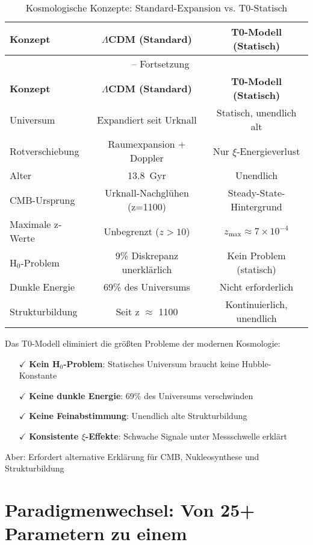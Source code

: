 \documentclass[12pt,a4paper]{article}
\theoremstyle{definition}
\begin{document}
	\begin{longtable}{lcc}
		\caption{Kosmologische Konzepte: Standard-Expansion vs. T0-Statisch} \\
		\toprule
		\textbf{Konzept} & \textbf{$\Lambda$CDM (Standard)} & \textbf{T0-Modell (Statisch)} \\
		\midrule
		\endfirsthead
		\multicolumn{3}{c}{\tablename\ \thetable{} -- Fortsetzung} \\
		\toprule
		\textbf{Konzept} & \textbf{$\Lambda$CDM (Standard)} & \textbf{T0-Modell (Statisch)} \\
		\midrule
		\endhead
		Universum & Expandiert seit Urknall & Statisch, unendlich alt \\
		Rotverschiebung & Raumexpansion + Doppler & Nur $\xi$-Energieverlust \\
		Alter & \SI{13.8}{Gyr} & Unendlich \\
		CMB-Ursprung & Urknall-Nachglühen (z=1100) & Steady-State-Hintergrund \\
		Maximale z-Werte & Unbegrenzt ($z > 10$) & $z_{\text{max}} \approx 7 \times 10^{-4}$ \\
		H$_0$-Problem & 9\% Diskrepanz unerklärlich & Kein Problem (statisch) \\
		Dunkle Energie & 69\% des Universums & Nicht erforderlich \\
		Strukturbildung & Seit z $\approx$ 1100 & Kontinuierlich, unendlich \\
		\bottomrule
	\end{longtable}
	
	\begin{revolutionary}
		Das T0-Modell eliminiert die größten Probleme der modernen Kosmologie:
		\begin{itemize}
			\item[$\checkmark$] \textbf{Kein H$_0$-Problem}: Statisches Universum braucht keine Hubble-Konstante
			\item[$\checkmark$] \textbf{Keine dunkle Energie}: 69\% des Universums verschwinden
			\item[$\checkmark$] \textbf{Keine Feinabstimmung}: Unendlich alte Strukturbildung
			\item[$\checkmark$] \textbf{Konsistente $\xi$-Effekte}: Schwache Signale unter Messschwelle erklärt
		\end{itemize}
		Aber: Erfordert alternative Erklärung für CMB, Nukleosynthese und Strukturbildung
	\end{revolutionary}
	
	\section{Paradigmenwechsel: Von 25+ Parametern zu einem}
	
\end{document}

